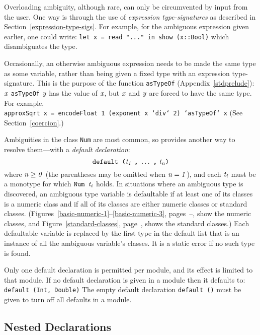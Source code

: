 Overloading ambiguity, although rare, can only be circumvented by
input from the user.  One way is through the use of {\em expression
type-signatures}
as described in Section~\ref{expression-type-sigs}.
For example, for the ambiguous expression given earlier, one could
write:
\bprog
\mbox{\tt let\ x\ =\ read\ "..."\ in\ show\ (x::Bool)}
\eprog
which disambiguates the type.

Occasionally, an otherwise ambiguous expression needs to be made
the same type as some variable, rather than being given a fixed
type with an expression type-signature.  This is the purpose
of the function \mbox{\tt asTypeOf} (Appendix~\ref{stdprelude}):
\mbox{$\it x$} \mbox{\tt asTypeOf} \mbox{$\it y$} has the value of \mbox{$\it x$}, but \mbox{$\it x$} and \mbox{$\it y$} are
forced to have the same type.  For example,
\bprog
\mbox{\tt approxSqrt\ x\ =\ encodeFloat\ 1\ (exponent\ x\ `div`\ 2)\ `asTypeOf`\ x}
\eprog
(See Section~\ref{coercion}.)

Ambiguities in the class \mbox{\tt Num}
are most common, so \Haskell{}
provides another way to resolve them---with a {\em
default declaration}:
\[
\mbox{$\it \makebox{\tt default\ (}t_1\ \makebox{\tt ,}\ \ldots \ \makebox{\tt ,}\ t_n\makebox{\tt )}$}
\]
where \mbox{$\it n\geq0$} (the parentheses may be omitted when \mbox{$\it n=1$}), and each
\mbox{$\it t_i$} must be a monotype for which \mbox{$\it \makebox{\tt Num\ }t_i$} holds.
In situations where an ambiguous type is discovered, an
ambiguous type variable is defaultable if at least one
of its classes is a numeric class and if all of its classes
are either numeric classes or standard classes.
(Figures~\ref{basic-numeric-1}--\ref{basic-numeric-3},
pages~\pageref{basic-numeric-1}--\pageref{basic-numeric-3},
show the numeric classes, and
Figure~\ref{standard-classes}, page~\pageref{standard-classes},
shows the standard classes.)
Each defaultable variable is replaced by the first type in the
default list that is an instance of all the ambiguous variable's classes.
It is a static error if no such type is found.

Only one default declaration is permitted per module, and its effect
is limited to that module.  If no default declaration is given in a
module then it defaults to:
\bprog
\mbox{\tt default\ (Int,\ Double)}
\eprog
The empty default declaration \mbox{\tt default\ ()} must be given to turn off
all defaults in a module.

\subsection{Nested Declarations}
\label{nested}

